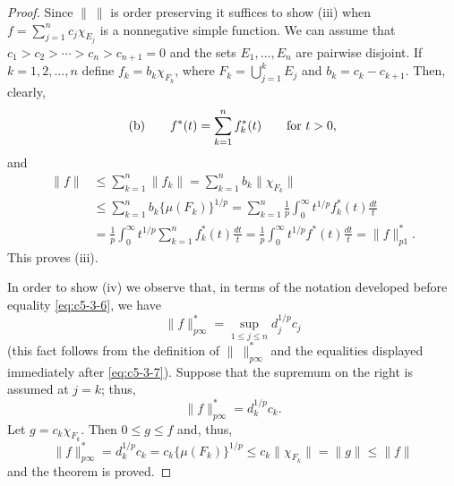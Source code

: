 \begin{proof}
Since $\|\ \|$ is order preserving it suffices to show (iii) when
$f = \sum_{j=1}^{n}c_{j}\chi_{E_{j}}$ is a nonnegative simple function. We can
assume that $c_{1} > c_{2} > \cdots > c_{n} > c_{n+1} = 0$ and the sets
$E_{1}, \ldots, E_{n}$ are pairwise disjoint. If $k = 1, 2, \ldots, n$ define
$f_{k} = b_{k}\chi_{F_{k}}$, where $F_{k} = \bigcup_{j=1}^{k}E_{j}$ and
$b_{k} = c_{k} - c_{k+1}$. Then, clearly,
\[
\textup{(b)}\qquad
f^{*}(t)=\sum_{k=1}^{n}f_{k}^{*}(t)\qquad\text{for } t > 0,
\]
and
\begin{align*}
\|f\|&\leq\sum_{k=1}^{n}\|f_{k}\|=\sum_{k=1}^{n}b_{k}\|\chi_{F_{k}}\|\\
&\leq\sum_{k=1}^{n}b_{k}\{\mu(F_{k})\}^{1/p}
=\sum_{k=1}^{n}\frac{1}{p}\int_{0}^{\infty}t^{1/p}f_{k}^{*}(t)\frac{dt}{t}\\
&=\frac{1}{p}\int_{0}^{\infty}t^{1/p}\sum_{k=1}^{n}f_{k}^{*}(t)\frac{dt}{t}
=\frac{1}{p}\int_{0}^{\infty}t^{1/p}f^{*}(t)\frac{dt}{t}=\|f\|_{p1}^{*}.
\end{align*}
This proves (iii).

In order to show (iv) we observe that, in terms of the notation developed
before equality \eqref{eq:c5-3-6}, we have
\[
\|f\|_{p\infty}^{*}=\sup_{1 \leq j \leq n}d_{j}^{1/p}c_{j}
\]
(this fact follows from the definition of $\|\ \|_{p\infty}^{*}$ and the
equalities displayed immediately after \eqref{eq:c5-3-7}). Suppose that the
supremum on the right is assumed at $j = k$; thus,
\[
\|f\|_{p\infty}^{*}=d_{k}^{1/p}c_{k}.
\]
Let $g = c_{k}\chi_{F_{k}}$. Then $0 \leq g \leq f$ and, thus,
\[
\|f\|_{p\infty}^{*}=d_{k}^{1/p}c_{k}=c_{k}\{\mu(F_{k})\}^{1/p}
\leq c_{k}\|\chi_{F_{k}}\|=\|g\|\leq\|f\|
\]
and the theorem is proved.
\end{proof}

